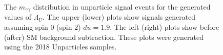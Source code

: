 \begin{figure}[tbp!]
\begin{center}
\end{center}
\caption{The $m_{\gamma\gamma}$ distribution in unparticle signal events for the generated values of $\Lambda_U$. The upper (lower) plots show signals generated assuming spin-0 (spin-2) $du = 1.9$. The left (right) plots show before (after) SM background subtraction. These plots were generated using the 2018 Unparticles samples.
}
\label{fig:BkgSub}
\end{figure}



\newpage
% 
% 
